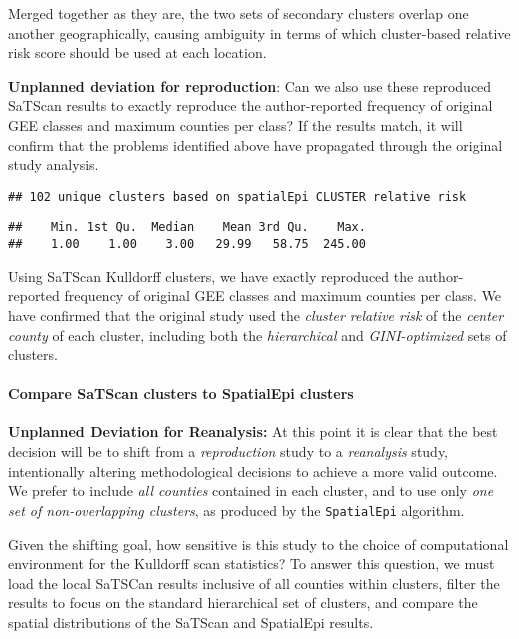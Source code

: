 \documentclass[
]{article}
\begin{document}
Merged together as they are, the two sets of secondary clusters overlap
one another geographically, causing ambiguity in terms of which
cluster-based relative risk score should be used at each location.

\textbf{Unplanned deviation for reproduction}: Can we also use these
reproduced SaTScan results to exactly reproduce the author-reported
frequency of original GEE classes and maximum counties per class? If the
results match, it will confirm that the problems identified above have
propagated through the original study analysis.

\begin{verbatim}
## 102 unique clusters based on spatialEpi CLUSTER relative risk
\end{verbatim}

\begin{verbatim}
##    Min. 1st Qu.  Median    Mean 3rd Qu.    Max. 
##    1.00    1.00    3.00   29.99   58.75  245.00
\end{verbatim}

Using SaTScan Kulldorff clusters, we have exactly reproduced the
author-reported frequency of original GEE classes and maximum counties
per class. We have confirmed that the original study used the
\emph{cluster relative risk} of the \emph{center county} of each
cluster, including both the \emph{hierarchical} and
\emph{GINI-optimized} sets of clusters.

\hypertarget{compare-satscan-clusters-to-spatialepi-clusters}{%
\paragraph{Compare SaTScan clusters to SpatialEpi
clusters}\label{compare-satscan-clusters-to-spatialepi-clusters}}

\textbf{Unplanned Deviation for Reanalysis:} At this point it is clear
that the best decision will be to shift from a \emph{reproduction} study
to a \emph{reanalysis} study, intentionally altering methodological
decisions to achieve a more valid outcome. We prefer to include
\emph{all counties} contained in each cluster, and to use only \emph{one
set of non-overlapping clusters}, as produced by the \texttt{SpatialEpi}
algorithm.

Given the shifting goal, how sensitive is this study to the choice of
computational environment for the Kulldorff scan statistics? To answer
this question, we must load the local SaTSCan results inclusive of all
counties within clusters, filter the results to focus on the standard
hierarchical set of clusters, and compare the spatial distributions of
the SaTScan and SpatialEpi results.
\end{document}
